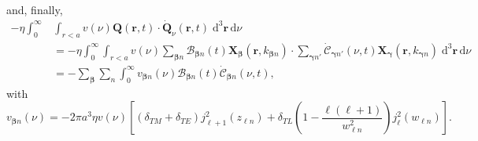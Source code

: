 \documentclass{article}
\begin{document}
and, finally,
\begin{equation}
\begin{split}
-\eta\int_0^\infty&\int_{r<a} v(\nu)\mathbf{Q}(\mathbf{r},t)\cdot\dot{\mathbf{Q}}_\nu(\mathbf{r},t)\;\mathrm{d}^3\mathbf{r}\,\mathrm{d}\nu
\\
&= -\eta\int_0^\infty\int_{r<a} v(\nu)\sum_{\bm{\beta}n}\mathcal{B}_{\bm{\beta}n}(t)\mathbf{X}_{\bm{\beta}}(\mathbf{r},k_{\bm{\beta}n})\cdot\sum_{\bm{\gamma}n'}\dot{\mathcal{C}}_{\bm{\gamma}n'}(\nu,t)\mathbf{X}_{\bm{\gamma}}(\mathbf{r},k_{\bm{\gamma}n})\;\mathrm{d}^3\mathbf{r}\,\mathrm{d}\nu\\
&
= -\sum_{\bm{\beta}}\sum_{n}\int_0^\infty v_{\bm{\beta}n}(\nu)\mathcal{B}_{\bm{\beta}n}(t)\dot{\mathcal{C}}_{\bm{\beta}n}(\nu,t),
\end{split}
\end{equation}
with
\begin{equation}
v_{\bm{\beta}n}(\nu) = -2\pi a^3\eta v(\nu)\left[(\delta_{TM} + \delta_{TE})j_{\ell + 1}^2(z_{\ell n}) + \delta_{TL}\left(1 - \frac{\ell(\ell + 1)}{w_{\ell n}^2}\right)j_\ell^2(w_{\ell n})\right].
\end{equation}
\end{document}
